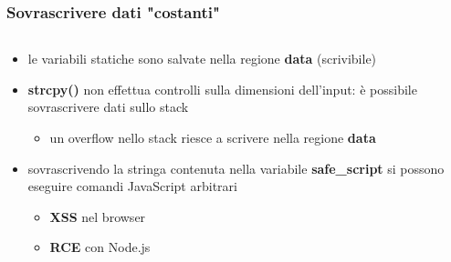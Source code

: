 \documentclass{beamer}
\begin{document}
\begin{frame}
  \frametitle{Sovrascrivere dati "costanti"}
  \begin{columns}
    \begin{column}{0.55\textwidth}
      \begin{itemize}
        \item le variabili statiche sono salvate nella regione \textbf{data}
          (scrivibile)
        \item \textbf{strcpy()} non effettua controlli sulla dimensioni dell'input: è possibile sovrascrivere dati sullo stack
        \begin{itemize}
          \item un overflow nello stack riesce a scrivere nella regione \textbf{data}
        \end{itemize}
      \item sovrascrivendo la stringa contenuta nella variabile
        \textbf{safe\_script} si
          possono eseguire comandi JavaScript arbitrari
        \begin{itemize}
          \item \textbf{XSS} nel browser
          \item \textbf{RCE} con Node.js
        \end{itemize}


\end{itemize}
\end{column}
\end{columns}
\end{frame}
\end{document}
